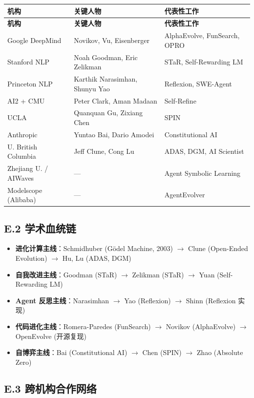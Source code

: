 \begin{longtable}{p{3.5cm}p{3cm}p{4.5cm}}
\toprule
\textbf{机构} & \textbf{关键人物} & \textbf{代表性工作} \\
\midrule
\endfirsthead
\toprule
\textbf{机构} & \textbf{关键人物} & \textbf{代表性工作} \\
\midrule
\endhead
\bottomrule
\endlastfoot

Google DeepMind & Novikov, Vu, Eisenberger & AlphaEvolve, FunSearch, OPRO \\
Stanford NLP & Noah Goodman, Eric Zelikman & STaR, Self-Rewarding LM \\
Princeton NLP & Karthik Narasimhan, Shunyu Yao & Reflexion, SWE-Agent \\
AI2 + CMU & Peter Clark, Aman Madaan & Self-Refine \\
UCLA & Quanquan Gu, Zixiang Chen & SPIN \\
Anthropic & Yuntao Bai, Dario Amodei & Constitutional AI \\
U. British Columbia & Jeff Clune, Cong Lu & ADAS, DGM, AI Scientist \\
Zhejiang U. / AIWaves & — & Agent Symbolic Learning \\
Modelscope (Alibaba) & — & AgentEvolver \\
\end{longtable}

\subsection*{E.2 学术血统链}

\begin{itemize}
\item \textbf{进化计算主线}：Schmidhuber (G\"{o}del Machine, 2003) $\to$ Clune (Open-Ended Evolution) $\to$ Hu, Lu (ADAS, DGM)
\item \textbf{自我改进主线}：Goodman (STaR) $\to$ Zelikman (STaR) $\to$ Yuan (Self-Rewarding LM)
\item \textbf{Agent 反思主线}：Narasimhan $\to$ Yao (Reflexion) $\to$ Shinn (Reflexion 实现)
\item \textbf{代码进化主线}：Romera-Paredes (FunSearch) $\to$ Novikov (AlphaEvolve) $\to$ OpenEvolve (开源复现)
\item \textbf{自博弈主线}：Bai (Constitutional AI) $\to$ Chen (SPIN) $\to$ Zhao (Absolute Zero)
\end{itemize}

\subsection*{E.3 跨机构合作网络}

